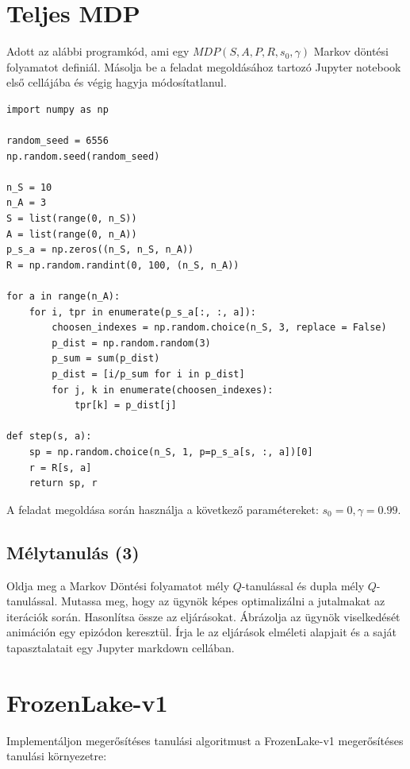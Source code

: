 \documentclass[english]{article}
\begin{document}
\newpage

\section{Teljes MDP}

Adott az alábbi programkód, ami egy $MDP(S,A,P,R,s_0,\gamma)$ Markov döntési folyamatot definiál. Másolja be a feladat megoldásához tartozó Jupyter notebook első cellájába és végig hagyja módosítatlanul.

\begin{lstlisting}[style=mystyle]
import numpy as np

random_seed = 6556
np.random.seed(random_seed)

n_S = 10
n_A = 3
S = list(range(0, n_S))
A = list(range(0, n_A))
p_s_a = np.zeros((n_S, n_S, n_A))
R = np.random.randint(0, 100, (n_S, n_A))

for a in range(n_A):
    for i, tpr in enumerate(p_s_a[:, :, a]):
        choosen_indexes = np.random.choice(n_S, 3, replace = False)
        p_dist = np.random.random(3)    
        p_sum = sum(p_dist)
        p_dist = [i/p_sum for i in p_dist]
        for j, k in enumerate(choosen_indexes):
            tpr[k] = p_dist[j]

def step(s, a):   
    sp = np.random.choice(n_S, 1, p=p_s_a[s, :, a])[0]
    r = R[s, a]    
    return sp, r
\end{lstlisting}
A feladat megoldása során használja a következő paramétereket: $s_0=0, \gamma=0.99$.

\subsection{Mélytanulás (3)}

Oldja meg a Markov Döntési folyamatot mély $Q$-tanulással és dupla mély $Q$-tanulással. Mutassa meg, hogy az ügynök képes optimalizálni a jutalmakat az iterációk során. Hasonlítsa össze az eljárásokat. Ábrázolja az ügynök viselkedését animáción egy epizódon keresztül. Írja le az eljárások elméleti alapjait és a saját tapasztalatait egy Jupyter markdown cellában. 

\newpage

\section{FrozenLake-v1}

Implementáljon megerősítéses tanulási algoritmust a FrozenLake-v1 megerősítéses tanulási környezetre:
\end{document}
